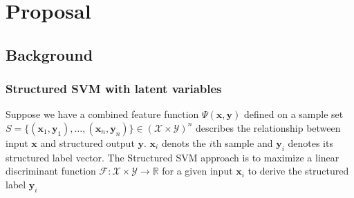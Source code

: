 \documentclass{article}
\begin{document}
	
	
	\section{Proposal}
	
	\subsection{Background}
		\subsubsection{Structured SVM with latent variables}
		Suppose we have a combined feature function $\Psi(\mathbf{x},\mathbf{y}) $ defined on a sample set $S=\{ ( \mathbf{x}_1,\mathbf{y}_1) ,\dots ,( \mathbf{x}_n,\mathbf{y}_n ) \} \in (\mathcal{X}\times \mathcal{Y})^n$ describes the relationship between input $\mathbf{x}$ and structured output $\mathbf{y}$. $ \mathbf{x}_i$ denots the $i$th sample and $\mathbf{y}_i$ denotes its structured label vector. The Structured SVM approach \cite{tsochantaridis2005large} is to maximize a linear discriminant function $\mathcal{F} : \mathcal{X} \times \mathcal{Y} \rightarrow \mathbb{R} $ for a given input $\mathbf{x}_i$ to derive the structured label $\mathbf{y}_i$
		
\end{document}

